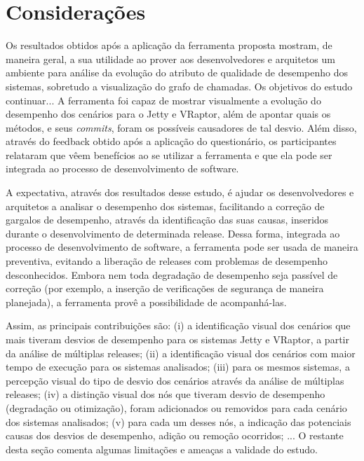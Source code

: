\section{Considerações} \label{sec:avaliacao-consideracoes}

Os resultados obtidos após a aplicação da ferramenta proposta mostram, de maneira geral, a sua utilidade ao prover aos desenvolvedores e arquitetos um ambiente para análise da evolução do atributo de qualidade de desempenho dos sistemas, sobretudo a visualização do grafo de chamadas. Os objetivos do estudo {\color{red} continuar...}
A ferramenta foi capaz de mostrar visualmente a evolução do desempenho dos cenários para o Jetty e VRaptor, além de apontar quais os métodos, e seus \textit{commits}, foram os possíveis causadores de tal desvio. Além disso, através do feedback obtido após a aplicação do questionário, os participantes relataram que vêem benefícios ao se utilizar a ferramenta e que ela pode ser integrada ao processo de desenvolvimento de software.

A expectativa, através dos resultados desse estudo, é ajudar os desenvolvedores e arquitetos a analisar o desempenho dos sistemas, facilitando a correção de gargalos de desempenho, através da identificação das suas causas, inseridos durante o desenvolvimento de determinada release. Dessa forma, integrada ao processo de desenvolvimento de software, a ferramenta pode ser usada de maneira preventiva, evitando a liberação de releases com problemas de desempenho desconhecidos. Embora nem toda degradação de desempenho seja passível de correção (por exemplo, a inserção de verificações de segurança de maneira planejada), a ferramenta provê a possibilidade de acompanhá-las.

Assim, as principais contribuições são: (i) a identificação visual dos cenários que mais tiveram desvios de desempenho para os sistemas Jetty e VRaptor, a partir da análise de múltiplas releases; (ii) a identificação visual dos cenários com maior tempo de execução para os sistemas analisados; (iii) para os mesmos sistemas, a percepção visual do tipo de desvio dos cenários através da análise de múltiplas releases; (iv) a distinção visual dos nós que tiveram desvio de desempenho (degradação ou otimização), foram adicionados ou removidos para cada cenário dos sistemas analisados; (v) para cada um desses nós, a indicação das potenciais causas dos desvios de desempenho, adição ou remoção ocorridos; ... O restante desta seção comenta algumas limitações e ameaças a validade do estudo.

